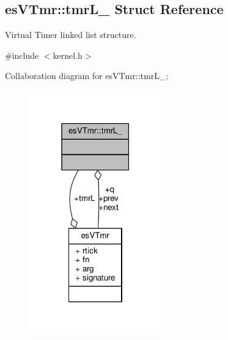 \hypertarget{structesVTmr_1_1tmrL__}{\subsection{es\-V\-Tmr\-:\-:tmr\-L\-\_\- Struct Reference}
\label{structesVTmr_1_1tmrL__}
}


Virtual Timer linked list structure.  




{\ttfamily \#include $<$kernel.\-h$>$}



Collaboration diagram for es\-V\-Tmr\-:\-:tmr\-L\-\_\-\-:\nopagebreak
\begin{figure}[H]
\begin{center}
\leavevmode
\includegraphics[width=162pt]{structesVTmr_1_1tmrL____coll__graph}
\end{center}
\end{figure}
